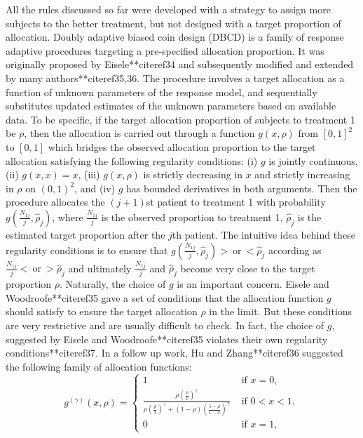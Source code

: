 All the rules discussed so far were developed with a strategy to assign
more subjects to the better treatment, but not designed with a target proportion of allocation. Doubly adaptive biased coin design (DBCD) is
a family of response adaptive procedures targeting a pre-specified
allocation proportion. It was originally proposed by Eisele**citeref{34}
and subsequently modified and extended by many authors**citeref{35,36}. The procedure involves a target allocation as a function of unknown parameters of the response model, and sequentially substitutes updated estimates of the unknown parameters based on available data. To be specific, if the target allocation proportion of subjects to treatment 1 be $\rho$, then the
allocation is carried out through a function $g(x,\rho)$ from $[0,1]^2$
to $[0,1]$ which bridges the observed allocation proportion to the
target allocation satisfying the following regularity conditions:
(i) $g$ is jointly continuous, (ii) $g(x,x)=x$, (iii) $g(x,\rho)$ is
strictly decreasing in $x$ and strictly increasing in $\rho$ on
$(0,1)^2$, and (iv) $g$ has bounded derivatives in both arguments.
Then the procedure allocates the $(j+1)$st patient to treatment 1
with probability $g(\frac{N_{1j}}{j},\widehat{\rho}_j)$, where
$\frac{N_{1j}}{j}$ is the observed proportion to treatment 1,
$\widehat{\rho}_j$ is the estimated target proportion after the
$j$th patient. The intuitive idea behind these regularity conditions is to ensure that $g(\frac{N_{1j}}{j},\widehat{\rho}_j)> ~\mbox{or}~ <\widehat{\rho}_j$ according as $\frac{N_{1j}}{j}<~\mbox{or}~>\widehat{\rho}_j$ and ultimately $\frac{N_{1j}}{j}$ and $\widehat{\rho}_j$ become very close to the target proportion $\rho$.  Naturally, the choice of $g$ is an important concern. Eisele and Woodroofe**citeref{35} gave a set of conditions that the allocation function $g$ should satisfy to ensure the target allocation $\rho$ in the limit. But these
conditions are very restrictive and are usually difficult to check.
In fact, the choice of $g$, suggested by  Eisele and Woodroofe**citeref{35}  violates their own regularity conditions**citeref{37}. In a follow up work, Hu and Zhang**citeref{36} suggested the following family of allocation functions:
\[g^{(\gamma)}(x,\rho) = \left\{
\begin{array}{ll}
1& \mbox{~if~} x=0,\\
\frac{\rho(\frac{\rho}{x})^{\gamma}}{\rho(\frac{\rho}{x})^{\gamma}+(1-\rho)(\frac{1-\rho}{1-x})^{\gamma}} & \mbox{~if~} 0<x<1,\\
0& \mbox{~if~} x=1,
\end{array}
\right. \]
